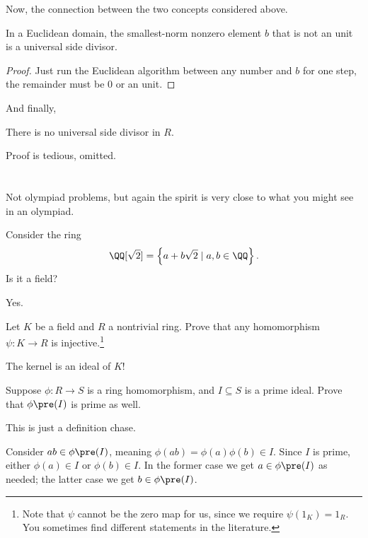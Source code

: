 Now, the connection between the two concepts considered above.
\begin{lemma}
	In a Euclidean domain,
	the smallest-norm nonzero element $b$ that is not an unit is a universal side divisor.
\end{lemma}
\begin{proof}
	Just run the Euclidean algorithm between any number and $b$ for one step, the remainder must be
	$0$ or an unit.
\end{proof}

And finally,
\begin{proposition}
	There is no universal side divisor in $R$.
\end{proposition}
Proof is tedious, omitted.  %

\section{\problemhead}
Not olympiad problems, but again the spirit is very close
to what you might see in an olympiad.

\begin{problem}
	Consider the ring
	\[ \QQ[\sqrt2] = \left\{ a + b\sqrt2 \mid a,b \in \QQ \right\}. \]
	Is it a field?
	\begin{hint}
		Yes.
	\end{hint}
\end{problem}

\begin{problem}
	\label{prob:field_hom}
	Let $K$ be a field and $R$ a nontrivial ring.
	Prove that any homomorphism $\psi \colon K \to R$
	is injective.\footnote{Note that $\psi$
		cannot be the zero map for us,
		since we require $\psi(1_K) = 1_R$.
		You sometimes find different statements in the literature.}
	\begin{hint}
		The kernel is an ideal of $K$!
	\end{hint}
\end{problem}

\begin{sproblem}
	\label{prob:prime_preimage}
	Suppose $\phi \colon R \to S$ is a ring homomorphism,
	and $I \subseteq S$ is a prime ideal.
	Prove that $\phi\pre(I)$ is prime as well.
	\begin{hint}
		This is just a definition chase.
	\end{hint}
	\begin{sol}
		Consider $ab \in \phi\pre(I)$,
		meaning $\phi(ab) = \phi(a) \phi(b) \in I$.
		Since $I$ is prime, either $\phi(a) \in I$ or $\phi(b) \in I$.
		In the former case we get $a \in \phi\pre(I)$ as needed;
		the latter case we get $b \in \phi\pre(I)$.
	\end{sol}
\end{sproblem}

